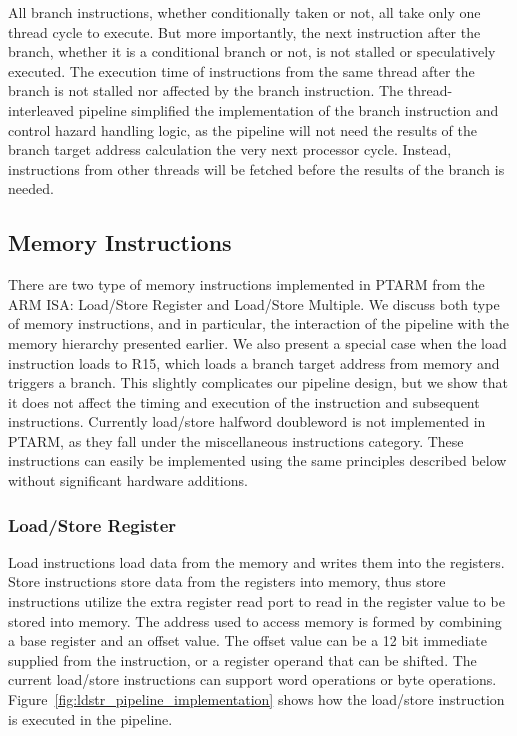 All branch instructions, whether conditionally taken or not, all take only one thread cycle to execute.
But more importantly, the next instruction after the branch, whether it is a conditional branch or not, is not stalled or speculatively executed. 
The execution time of instructions from the same thread after the branch is not stalled nor affected by the branch instruction.  
The thread-interleaved pipeline simplified the implementation of the branch instruction and control hazard handling logic, as the pipeline will not need the results of the branch target address calculation the very next processor cycle.  
Instead, instructions from other threads will be fetched before the results of the branch is needed.

\subsection{Memory Instructions}
There are two type of memory instructions implemented in PTARM from the ARM ISA: Load/Store Register and Load/Store Multiple.
We discuss both type of memory instructions, and in particular, the interaction of the pipeline with the memory hierarchy presented earlier. 
We also present a special case when the load instruction loads to R15, which loads a branch target address from memory and triggers a branch.  
This slightly complicates our pipeline design, but we show that it does not affect the timing and execution of the instruction and subsequent instructions.
Currently load/store halfword doubleword is not implemented in PTARM, as they fall under the miscellaneous instructions category. 
These instructions can easily be implemented using the same principles described below without significant hardware additions.       
  
\subsubsection{Load/Store Register}
Load instructions load data from the memory and writes them into the registers.
Store instructions store data from the registers into memory, thus store instructions utilize the extra register read port to read in the register value to be stored into memory.
The address used to access memory is formed by combining a base register and an offset value.
The offset value can be a 12 bit immediate supplied from the instruction, or a register operand that can be shifted.
The current load/store instructions can support word operations or byte operations.
Figure~\ref{fig:ldstr_pipeline_implementation} shows how the load/store instruction is executed in the pipeline.

